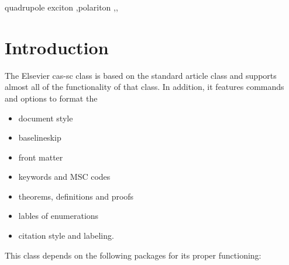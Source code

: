 \documentclass[a4paper,fleqn]{cas-sc}
\begin{document}

\begin{abstract}[S U M M A R Y]
This template helps you to create a properly formatted \LaTeX\ manuscript.

\noindent\texttt{\textbackslash begin{abstract}} \dots 
\texttt{\textbackslash end{abstract}} and
\verb+\begin{keyword}+ \verb+...+ \verb+\end{keyword}+ 
which
contain the abstract and keywords respectively. 
Each keyword shall be separated by a \verb+\sep+ command.
\end{abstract}
\begin{keywords}
quadrupole exciton \sep polariton \sep \WGM \sep \BEC
\end{keywords}


\maketitle


\section{Introduction}

The Elsevier cas-sc class is based on the
standard article class and supports almost all of the functionality of
that class. In addition, it features commands and options to format the
\begin{itemize} \item document style \item baselineskip \item front
matter \item keywords and MSC codes \item theorems, definitions and
proofs \item lables of enumerations \item citation style and labeling.
\end{itemize}

This class depends on the following packages
for its proper functioning:
\end{document}
